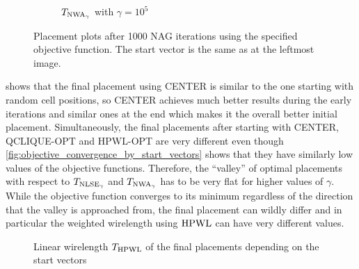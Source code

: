 \begin{figure}
\begin{subfigure}{.32\textwidth}
  \caption{\(T_{\operatorname{NWA}_\gamma}\) with \(\gamma = 10^5\)}
 \end{subfigure}

 \caption{Placement plots after 1000 NAG iterations using the specified objective function.
          The start vector is the same as at the leftmost image.}
\end{figure}

 shows that the final placement using CENTER
is similar to the one starting with random cell positions,
so CENTER achieves much better results during the early iterations and similar ones at the end
which makes it the overall better initial placement.
Simultaneously, the final placements after starting with CENTER, QCLIQUE-OPT and HPWL-OPT
are very different even though \cref{fig:objective_convergence_by_start_vectors} shows
that they have similarly low values of the objective functions.
Therefore, the \enquote{valley} of optimal placements with respect to \(T_{\operatorname{NLSE}_\gamma}\) and \(T_{\operatorname{NWA}_\gamma}\)
has to be very flat for higher values of \(\gamma\).
While the objective function converges to its minimum
regardless of the direction that the valley is approached from,
the final placement can wildly differ and in particular
the weighted wirelength using \(\operatorname{HPWL}\) can have very different values.

\begin{figure}[t]
 \centering
 \caption{Linear wirelength \(T_{\operatorname{HPWL}}\) of the final placements depending on the start vectors}
 \label{fig:start_vectors_hpwl_comparison}
\end{figure}

